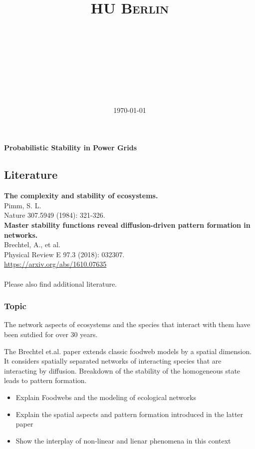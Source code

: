 \documentclass[a4paper,12pt]{article}
\title{
\vspace{2in}
\huge{\textsc{HU Berlin}\\\vspace{0.3cm}\hmwkClass}\\
\horrule{0.5pt} \\[0.4cm] %
\huge{\textmd{\textbf{\ \hmwkTitle}}}\\
\horrule{2pt} \\[0.5cm] %
\vspace{3in}
}
\author{\Large{\textbf{\hmwkAuthorName}}}
\date{\today} %
\newcommand{\hmwkTitle}{Probabilistic Stability in Power Grids} %
\newcommand{\hmwkDueDate}{} %
\begin{document}



\vspace*{1mm}
\begin{center}
    {\LARGE\textbf{\hmwkTitle}}\\
   \hmwkDueDate
\end{center}

\subsection*{Literature}
\textbf{The complexity and stability of ecosystems.}\\
Pimm, S. L.\\
Nature 307.5949 (1984): 321-326.\\

\textbf{Master stability functions reveal diffusion-driven pattern formation in networks.}\\
Brechtel, A., et al.\\
Physical Review E 97.3 (2018): 032307.\\
\url{https://arxiv.org/abs/1610.07635}\\
\\

Please also find additional literature.

\subsubsection*{Topic}

The network aspects of ecosystems and the species that interact with them have been sutdied for over 30 years.

The Brechtel et.al. paper extends classic foodweb models by a spatial dimension. It considers spatially separated networks of interacting species that are interacting by diffusion. Breakdown of the stability of the homogeneous state leads to pattern formation.

\small{
\begin{itemize}
\item Explain Foodwebs and the modeling of ecological networks
\item Explain the spatial aspects and pattern formation introduced in the latter paper
\item Show the interplay of non-linear and lienar phenomena in this context
\end{itemize}}
\end{document}
